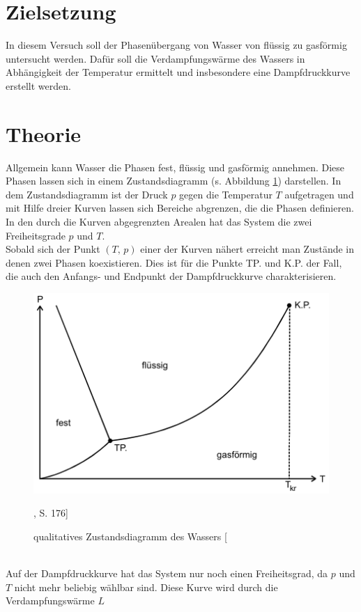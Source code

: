 \section{Zielsetzung}
In diesem Versuch soll der Phasenübergang von Wasser von flüssig zu gasförmig untersucht werden.
Dafür soll die Verdampfungswärme des Wassers in Abhängigkeit der Temperatur ermittelt und insbesondere eine Dampfdruckkurve
erstellt werden.

\section{Theorie}
Allgemein kann Wasser die Phasen fest, flüssig und gasförmig annehmen. Diese Phasen lassen sich in einem Zustandsdiagramm (s. Abbildung \ref{fig:theorie1})
darstellen. In dem Zustandsdiagramm ist der Druck $p$ gegen die Temperatur $T$ aufgetragen und mit Hilfe dreier Kurven lassen sich Bereiche abgrenzen, die 
die Phasen definieren. In den durch die Kurven abgegrenzten Arealen hat das System die zwei Freiheitsgrade $p$ und $T$.\\
Sobald sich der Punkt $(T{,}\,p)$ einer der Kurven nähert erreicht man Zustände in denen zwei Phasen koexistieren. Dies ist für die Punkte TP. und K.P. der Fall, die
auch den Anfangs- und Endpunkt der Dampfdruckkurve charakterisieren.\\
\label{sec:Theorie}
\begin{figure}
    \centering
    \includegraphics{Theorie1.png}
    \caption{qualitatives Zustandsdiagramm des Wassers [\cite{sample}}, S. 176]
    \label{fig:theorie1}
\end{figure}
\\
Auf der Dampfdruckkurve hat das System nur noch einen Freiheitsgrad, da $p$ und $T$ nicht mehr beliebig wählbar sind. Diese Kurve wird durch die Verdampfungswärme $L$
